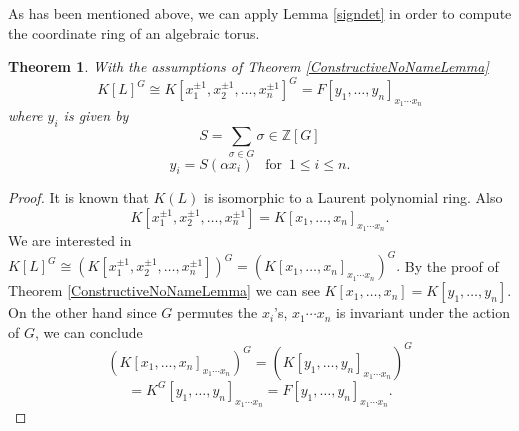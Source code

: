 \documentclass[12pt]{article}
\theoremstyle{plain}
\newtheorem{theorem}{Theorem}
\newcommand{\Z}{\ensuremath{\mathbb{Z}}}
\begin{document}
As has been mentioned above, we can apply Lemma \ref{signdet} in order to compute the coordinate ring of an algebraic torus. 
\begin{theorem}
With the assumptions of Theorem \ref{ConstructiveNoNameLemma} $$K[L]^G \cong K[x^{\pm 1}_1, x^{\pm 1}_2, \ldots , x^{\pm 1}_n]^G = F[y_1, \ldots , y_n]_{x_1\cdots x_n}$$ where $ y_i$ is given by $$S = \sum_{\sigma \in G} \sigma \in \Z[G]$$
$$y_i = S(\alpha x_i)  \,\,\,\,\, \text{for} \,\,\, 1\leq i \leq n.$$
\end{theorem}
\begin{proof}
It is known that $K(L)$ is isomorphic to a Laurent polynomial ring. Also $$K[x^{\pm 1}_1, x^{\pm 1}_2, \ldots , x^{\pm 1}_n] = K[x_1, \ldots , x_n]_{x_1\cdots x_n}.$$ We are interested in $K[L]^G \cong \left( K[x^{\pm 1}_1, x^{\pm 1}_2, \ldots , x^{\pm 1}_n] \right)^G = \left(K[x_1, \ldots , x_n]_{x_1\cdots x_n} \right) ^G.$ By the proof of Theorem \ref{ConstructiveNoNameLemma} we can see $K[x_1, \ldots , x_n] = K[y_1, \ldots , y_n]$. 
On the other hand since $G$ permutes the $x_i$'s, $x_1\cdots x_n$ is invariant under the action of $G$, we can conclude $$\left( K[x_1, \ldots , x_n]_{x_1\cdots x_n}\right)^G =  \left( K[y_1, \ldots , y_n]_{x_1\cdots x_n} \right)^G$$$$ = K^G [y_1, \ldots , y_n]_{x_1\cdots x_n} =  F[y_1, \ldots , y_n]_{x_1\cdots x_n}.$$ 
\end{proof}
\end{document}
